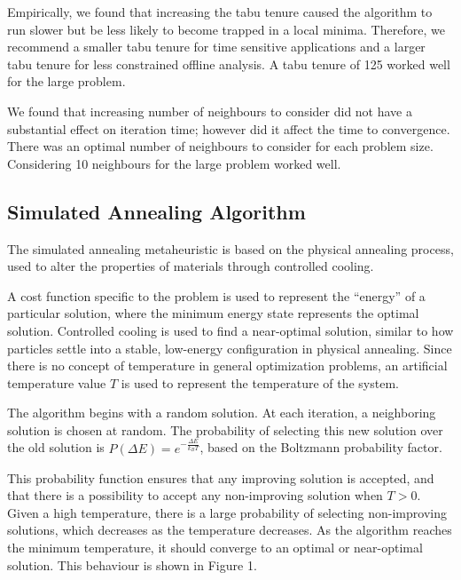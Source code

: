 \documentclass[a4paper]{article}
\begin{document}
Empirically, we found that increasing the tabu tenure caused the algorithm to run slower but be less likely to become trapped in a local minima. Therefore, we recommend a smaller tabu tenure for time sensitive applications and a larger tabu tenure for less constrained offline analysis. A tabu tenure of 125 worked well for the large problem.

We found that increasing number of neighbours to consider did not have a substantial effect on iteration time; however did it affect the time to convergence. There was an optimal number of neighbours to consider for each problem size. Considering 10 neighbours for the large problem worked well.

\subsection{Simulated Annealing Algorithm} %

The simulated annealing metaheuristic is based on the physical annealing process, used to alter the properties of materials through controlled cooling.\cite{Kirkpatrick}

A cost function specific to the problem is used to represent the ``energy'' of a particular solution, where the minimum energy state represents the optimal solution.
Controlled cooling is used to find a near-optimal solution, similar to how particles settle into a stable, low-energy configuration in physical annealing.
Since there is no concept of temperature in general optimization problems, an artificial temperature value $T$ is used to represent the temperature of the system.

The algorithm begins with a random solution. At each iteration, a neighboring solution is chosen at random. The probability of selecting this new solution over the old solution is $\mathit{P}(\Delta{}E) = e^{-\frac{\Delta{}E}{k_{B}T}}$, based on the Boltzmann probability factor.\cite{Kirkpatrick}

This probability function ensures that any improving solution is accepted, and that there is a possibility to accept any non-improving solution when $T>0$. Given a high temperature, there is a large probability of selecting non-improving solutions, which decreases as the temperature decreases. As the algorithm reaches the minimum temperature, it should converge to an optimal or near-optimal solution. This behaviour is shown in Figure 1.
\end{document}

